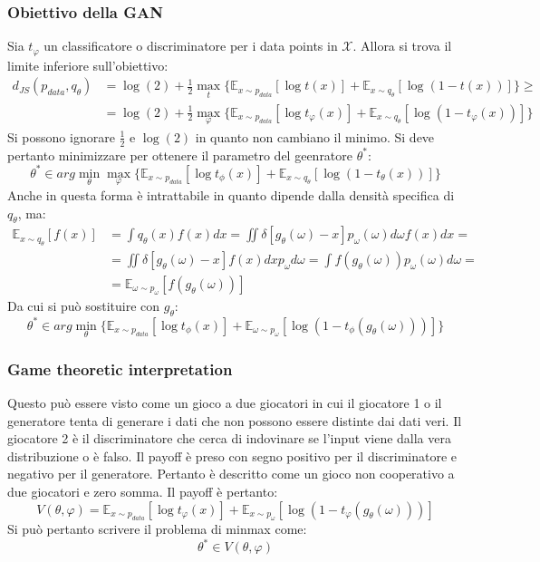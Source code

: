 		\subsubsection{Obiettivo della GAN}
		Sia $t_\varphi$ un classificatore o discriminatore per i data points in $\mathcal{X}$.
		Allora si trova il limite inferiore sull'obiettivo:
		\begin{align*}
			d_{JS}(p_{data}, q_\theta) &= \log(2) + \frac{1}{2}\max\limits_t\{\mathbb{E}_{x\sim p_{data}}[\log t(x)] + \mathbb{E}_{x\sim q_\theta}[\log(1-t(x))]\}\ge\\
																 &= \log(2) + \frac{1}{2}\max\limits_\varphi\{\mathbb{E}_{x\sim p_{data}}[\log t_\varphi(x)] + \mathbb{E}_{x\sim q_\theta}[\log(1-t_\varphi(x))]\}
		\end{align*}
		Si possono ignorare $\frac{1}{2}$ e $\log(2)$ in quanto non cambiano il minimo.
		Si deve pertanto minimizzare per ottenere il parametro del geenratore $\theta^*$:
		$$\theta^*\in arg\min\limits_\theta\max\limits_\varphi\{\mathbb{E}_{x\sim p_{data}}[\log t_\phi(x)] + \mathbb{E}_{x\sim q_\theta}[\log(1-t_\theta(x))]\}$$
		Anche in questa forma \`e intrattabile in quanto dipende dalla densit\`a specifica di $q_\theta$, ma:
		\begin{align*}
			\mathbb{E}_{x\sim q_\theta}[f(x)] &= \int q_\theta(x)f(x)dx = \iint\delta[g_\theta(\omega)-x]p_\omega(\omega)d\omega f(x)dx=\\
																				& = \iint\delta[g_\theta(\omega)-x]f(x)dxp_\omega d\omega = \int f(g_\theta(\omega))p_\omega(\omega)d\omega = \\
																				&= \mathbb{E}_{\omega\sim p_\omega}[f(g_\theta(\omega))]
		\end{align*}
		Da cui si pu\`o sostituire con $g_\theta$:
		$$\theta^*\in arg\min\limits_{\theta}\{\mathbb{E}_{x\sim p_{data}}[\log t_\phi(x)]+\mathbb{E}_{\omega\sim p_\omega}[\log(1-t_\phi(g_\theta(\omega)))]\}$$

		\subsubsection{Game theoretic interpretation}
		Questo pu\`o essere visto come un gioco a due giocatori in cui il giocatore 1 o il generatore tenta di generare i dati che non possono essere distinte dai dati veri.
		Il giocatore 2 \`e il discriminatore che cerca di indovinare se l'input viene dalla vera distribuzione o \`e falso.
		Il payoff \`e preso con segno positivo per il discriminatore e negativo per il generatore.
		Pertanto \`e descritto come un gioco non cooperativo a due giocatori e zero somma.
		Il payoff \`e pertanto:
		$$V(\theta,\varphi) = \mathbb{E}_{x\sim p_{data}}[\log t_\varphi(x)]+\mathbb{E}_{x\sim p_\omega}[\log(1-t_\varphi(g_\theta(\omega)))]$$
		Si pu\`o pertanto scrivere il problema di minmax come:
		$$\theta^*\in V(\theta,\varphi)$$


